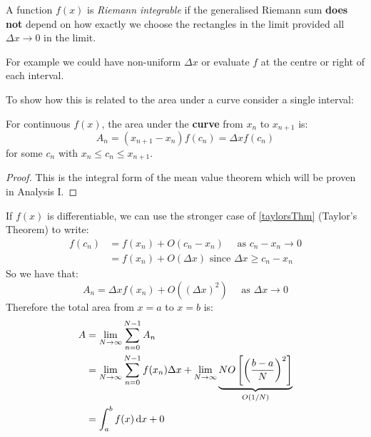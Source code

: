\documentclass[../main.tex]{subfiles}
\begin{document}
\begin{definition}
  A function $f(x)$ is \textit{Riemann integrable} if the generalised Riemann sum \textbf{does not} depend on how exactly we choose the rectangles in the limit provided all $\Delta x \to 0$ in the limit.

  For example we could have non-uniform $\Delta x$ or evaluate $f$ at the centre or right of each interval.
\end{definition}
To show how this is related to the area under a curve consider a single interval:
\begin{center}
\end{center}
\begin{theorem}
  For continuous $f(x)$, the area under the \textbf{curve} from $x_n$ to $x_{n + 1}$ is:
  \[
    A_n = (x_{n+1}-x_n)f(c_n) = \Delta x f(c_n)
    \label{meanValue}
  \]
  for some $c_n$ with $x_n \leq c_n \leq x_{n+1}$.
\end{theorem}
\begin{proof}
  This is the integral form of the mean value theorem which will be proven in Analysis I.
\end{proof}
If $f(x)$ is differentiable, we can use the stronger case of \cref{taylorsThm} (Taylor's Theorem) to write:
\begin{align*}
  f(c_n) &= f(x_n) + O(c_n - x_n) \quad \text{ as } c_n - x_n \to 0 \\
         &= f(x_n) + O(\Delta x) \text{ since $\Delta x \geq c_n - x_n$}
\end{align*}
So we have that:
\[
  A_n = \Delta x f(x_n) + O((\Delta x)^2) \quad \text{ as } \Delta x \to 0
\]
Therefore the total area from $x=a$ to $x=b$ is:
\begin{align*}
  A &= \lim_{N \to \infty} \sum_{n=0}^{N-1} A_n \\
    &= \lim_{N \to \infty} \sum_{n=0}^{N-1} f(x_n) \Delta x + \lim_{N \to \infty} \underbrace{NO\left[\left(\frac{b-a}{N}\right)^2\right]}_{O(1/N)} \\
    &= \int_{a}^{b} f(x) \d{x} + 0
\end{align*}
\end{document}
